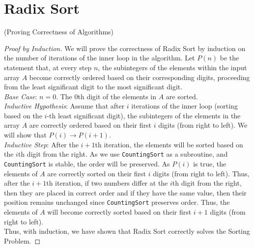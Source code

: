 \documentclass[11pt]{scrartcl}
\theoremstyle{dotlessP}
\theoremstyle{dotlessN}
\begin{document}
\section{Radix Sort}
\begin{ans} (Proving Correctness of Algorithms)\ 
	\begin{proof}
		[Proof by Induction] We will prove the correctness of Radix Sort by induction on the number of iterations of the inner loop in the algorithm. Let $P(n)$ be the statement that, at every step $n$, the subintegers of the elements within the input array $A$ become correctly ordered based on their corresponding digits, proceeding from the least significant digit to the most significant digit. 		\\
		
		\textit{Base Case}: $n=0$. The 0th digit of the elements in $A$ are sorted.
\\

		\textit{Inductive Hypothesis}: Assume that after $i$ iterations of the inner loop (sorting based on the $i$-th least significant digit), the subintegers of the elements in the array $A$ are correctly ordered based on their first $i$ digits (from right to left). We will show that $P(i) \to P(i + 1)$.
\\

\textit{Inductive Step}:  After the $i+ 1$th iteration, the elements will be sorted based on the $i$th digit from the right. As we use \texttt{CountingSort} as a subroutine, and \texttt{CountingSort} is stable, the order will be preserved. As $P(i)$ is true, the elements of $A$ are correctly sorted on their first $i$ digits (from right to left). Thus, after the $i+1$th iteration, if two numbers differ at the $i$th digit from the right, then they are placed in correct order and if they have the same value, then their position remains unchanged since \texttt{CountingSort} preserves order. Thus, the elements of $A$ will become correctly sorted based on their first $i+1$ digits (from right to left).
\\

Thus, with induction, we have shown that Radix Sort correctly solves the Sorting Problem.
	\end{proof}
\end{ans}
\end{document}
